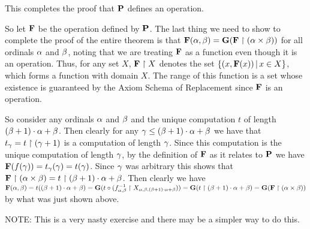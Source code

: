 {{    This completes the proof that $\P$ defines an operation.

    So let $\F$ be the operation defined by $\P$.
    The last thing we need to show to complete the proof of the entire theorem is that $\F(\a, \b) = \G(\F \rest (\a \times \b))$ for all ordinals $\a$ and $\b$, noting that we are treating $\F$ as a function even though it is an operation.
    Thus, for any set $X$, $\F \rest X$ denotes the set $\braces{(x, \F(x)) \where x \in X}$, which forms a function with domain $X$.
    The range of this function is a set whose existence is guaranteed by the Axiom Schema of Replacement since $\F$ is an operation.

    So consider any ordinals $\a$ and $\b$ and the unique computation $t$ of length $(\b+1)\cdot\a + \b$.
    Then clearly for any $\g \leq (\b+1)\cdot\a + \b$ we have that $t_\g = t \rest (\g+1)$ is a computation of length $\g$.
    Since this computation is the unique computation of length $\g$, by the definition of $\F$ as it relates to $\P$ we have $\F(f(\g)) = t_\g(\g) = t(\g)$.
    Since $\g$ was arbitrary this shows that $\F \rest (\a \times \b) = t \rest (\b+1)\cdot\a + \b$.
    Then clearly we have $\F(\a, \b) = t((\b+1)\cdot\a + \b) = \G(t \circ (\inv{f_{\a,\b}} \rest X_{\a,\b,(\b+1)\cdot\a + \b})) = \G(t \rest (\b+1)\cdot\a + \b) = \G(\F \rest (\a \times \b))$ by what was just shown above.
  }

  NOTE: This is a very nasty exercise and there may be a simpler way to do this.
}

